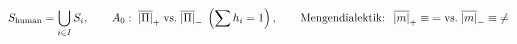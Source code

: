 \documentclass[preview]{standalone}
\begin{document}
\begin{align*}
\special{dvisvgm:raw <g id='unique000'>}S_{\text{human}} = \bigcup_{i\in I} S_i, \qquad A_0:\; \overline{|\Pi|}_+ \;\text{vs.}\; \overline{|\Pi|}_-\;\left(\sum h_i = 1\right), \qquad \text{Mengendialektik: }\; \overline{|m|}_+ \equiv {=} \;\text{vs.}\; \overline{|m|}_- \equiv {\neq}\special{dvisvgm:raw </g>}
\end{align*}
\end{document}

